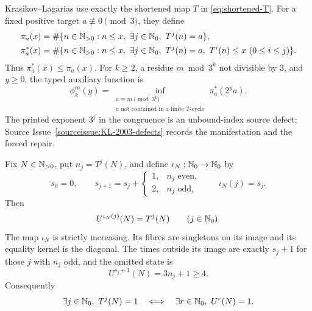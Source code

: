 Krasikov--Lagarias use exactly the shortened map \(T\) in
\eqref{eq:shortened-T}.  For a fixed positive target
\(a\not\equiv0\pmod3\), they define
\begin{align}
 \pi_a(x)
  &=
  \#\{n\in\mathbb{N}_{>0}: n\le x,\ \exists j\in\mathbb{N}_{0},\ T^j(n)=a\},
  \label{eq:KL-pi}\\
 \pi_a^*(x)
  &=
  \#\{n\in\mathbb{N}_{>0}:n\le x,\ \exists j\in\mathbb{N}_{0},\ T^j(n)=a,\
       T^i(n)\le x\ (0\le i\le j)\}.
  \label{eq:KL-pi-star}
\end{align}
Thus \(\pi_a^*(x)\le\pi_a(x)\).  For \(k\ge2\), a residue
\(m\bmod3^k\) not divisible by \(3\), and \(y\ge0\), the typed auxiliary
function is
\begin{equation}
\label{eq:KL-phi}
 \phi_k^m(y)=
 \inf_{\substack{a\equiv m\pmod{3^k}\\
                  a\text{ not contained in a finite }T\text{-cycle}}}
 \pi_a^*(2^ya).
\end{equation}
The printed exponent \(3^j\) in the congruence is an unbound-index source
defect; Source Issue~\ref{sourceissue:KL-2003-defects} records the
manifestation and the forced repair.

\begin{proposition}
\label{prop:KL-Tao-clock-embedding}
Fix \(N\in\mathbb{N}_{>0}\), put \(n_j=T^j(N)\), and define
\(\iota_N:\mathbb{N}_{0}\to\mathbb{N}_{0}\) by
\begin{equation}
\label{eq:KL-Tao-clock}
 s_0=0,\qquad
 s_{j+1}=s_j+
 \begin{cases}
  1,&n_j\text{ even},\\
  2,&n_j\text{ odd},
 \end{cases}
 \qquad \iota_N(j)=s_j.
\end{equation}
Then
\begin{equation}
\label{eq:KL-Tao-clock-intertwining}
 U^{\iota_N(j)}(N)=T^j(N)\qquad(j\in\mathbb{N}_{0}).
\end{equation}
The map \(\iota_N\) is strictly increasing.  Its fibres are singletons on
its image and its equality kernel is the diagonal.  The times outside its
image are exactly \(s_j+1\) for those \(j\) with \(n_j\) odd, and the omitted
state is
\begin{equation}
\label{eq:KL-Tao-omitted-state}
 U^{s_j+1}(N)=3n_j+1\ge4.
\end{equation}
Consequently
\begin{equation}
\label{eq:KL-Tao-reach-one}
 \exists j\in\mathbb{N}_{0},\ T^j(N)=1
 \quad\Longleftrightarrow\quad
 \exists r\in\mathbb{N}_{0},\ U^r(N)=1.
\end{equation}
\end{proposition}

